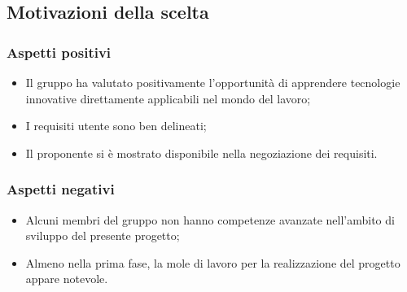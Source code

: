 \subsection{Motivazioni della scelta}
\subsubsection{Aspetti positivi}
\begin{itemize}
\item Il gruppo ha valutato positivamente l'opportunit\`a di apprendere tecnologie innovative
  direttamente applicabili nel mondo del lavoro;
\item I requisiti utente sono ben delineati;
\item Il proponente si \`e mostrato disponibile nella negoziazione dei requisiti.
\end{itemize}

\subsubsection{Aspetti negativi}
\begin{itemize}
\item Alcuni membri del gruppo non hanno competenze avanzate nell'ambito di sviluppo del presente progetto;
\item Almeno nella prima fase, la mole di lavoro per la realizzazione del progetto appare notevole.
\end{itemize}

